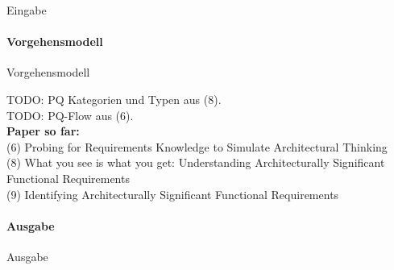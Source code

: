 Eingabe


\paragraph{Vorgehensmodell}

Vorgehensmodell


TODO: PQ Kategorien und Typen aus (8). \\

TODO: PQ-Flow aus (6). \\


\textbf{Paper so far:} \\
(6) Probing for Requirements Knowledge to Simulate Architectural Thinking \\
(8) What you see is what you get: Understanding Architecturally Significant Functional Requirements \\
(9) Identifying Architecturally Significant Functional Requirements \\



\paragraph{Ausgabe}

Ausgabe
